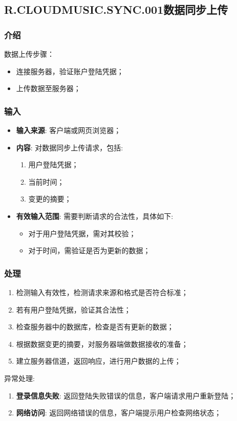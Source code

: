 \subsection{R.CLOUDMUSIC.SYNC.001数据同步上传}
\subsubsection{介绍}
	数据上传步骤：
	\begin{itemize}
		\item 连接服务器，验证账户登陆凭据；
		\item 上传数据至服务器；
	\end{itemize}
\subsubsection{输入}
	\begin{itemize}
		\item \textbf{输入来源}: 客户端或网页浏览器；
		\item \textbf{内容}: 对数据同步上传请求，包括: 
		\begin{enumerate}
			\item 用户登陆凭据；
			\item 当前时间；
			\item 变更的摘要；
		\end{enumerate}
		\item \textbf{有效输入范围}: 需要判断请求的合法性，具体如下: 
		\begin{itemize}
			\item 对于用户登陆凭据，需对其校验； 
			\item 对于时间，需验证是否为更新的数据； 
		\end{itemize}
	\end{itemize}
\subsubsection{处理}
	\begin{enumerate}
		\item 检测输入有效性，检测请求来源和格式是否符合标准；
		\item 若有用户登陆凭据，验证其合法性；
		\item 检查服务器中的数据库，检查是否有更新的数据；
		\item 根据数据变更的摘要，对服务器端做数据接收的准备；
		\item 建立服务器信道，返回响应，进行用户数据的上传；
	\end{enumerate}
	\noindent 异常处理: 
	\begin{enumerate}
		\item \textbf{登录信息失败}: 返回登陆失败错误的信息，客户端请求用户重新登陆；
		\item \textbf{网络访问}: 返回网络错误的信息，客户端提示用户检查网络状态；
	\end{enumerate}
